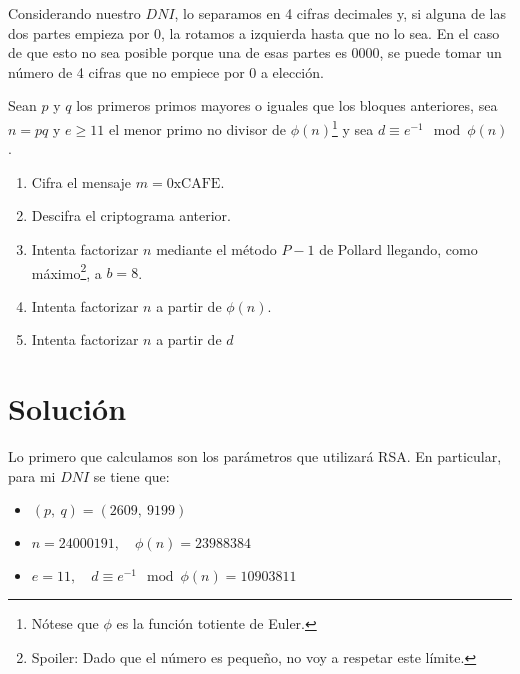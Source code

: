 	Considerando nuestro $DNI$, lo separamos en 4 cifras decimales y, si alguna de las dos partes empieza por 0,
	la rotamos a izquierda hasta que no lo sea. En el caso de que esto no sea posible porque una de esas partes
	es 0000, se puede tomar un número de 4 cifras que no empiece por 0 a elección.
	
	Sean $p$ y $q$ los primeros primos mayores o iguales que los bloques anteriores, sea $n = pq$ y $e \geq 11$
	el menor primo no divisor de $\phi(n)$\footnote{Nótese que $\phi$ es la función totiente de Euler.} y sea
	$d \equiv e^{-1} \mod \phi(n)$.
	\begin{enumerate}
		\item Cifra el mensaje $m = \mathrm{0xCAFE}$.
		\item Descifra el criptograma anterior.
		\item Intenta factorizar $n$ mediante el método $P-1$ de Pollard llegando, como máximo\footnote{Spoiler:
		Dado que el número es pequeño, no voy a respetar este límite.}, a $b = 8$.
		\item Intenta factorizar $n$ a partir de $\phi(n)$.
		\item Intenta factorizar $n$ a partir de $d$
	\end{enumerate}
\section*{Solución}
	Lo primero que calculamos son los parámetros que utilizará RSA. En particular, para mi $DNI$ se tiene que:
	\begin{itemize}
		\item $(p,\ q) = (2609,\ 9199)$
		\item $n = 24000191, \quad \phi(n) = 23988384$
		\item $e = 11, \quad d \equiv e^{-1} \mod \phi(n) = 10903811$
	\end{itemize}
	
